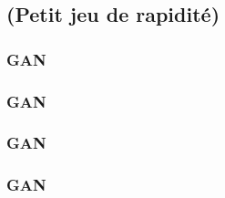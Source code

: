 \subsection{(\textbf{Petit jeu de rapidité})}



\begin{frame}
  \frametitle{GAN}
  \begin{minipage}[l]{0.49\linewidth}
  \end{minipage}\hfill
  \begin{minipage}[l]{0.49\linewidth}
  \end{minipage}\hfill
\end{frame}

\begin{frame}
  \frametitle{GAN}
\end{frame}

\begin{frame}
  \frametitle{GAN}
\end{frame}

\begin{frame}
  \frametitle{GAN}
\end{frame}

